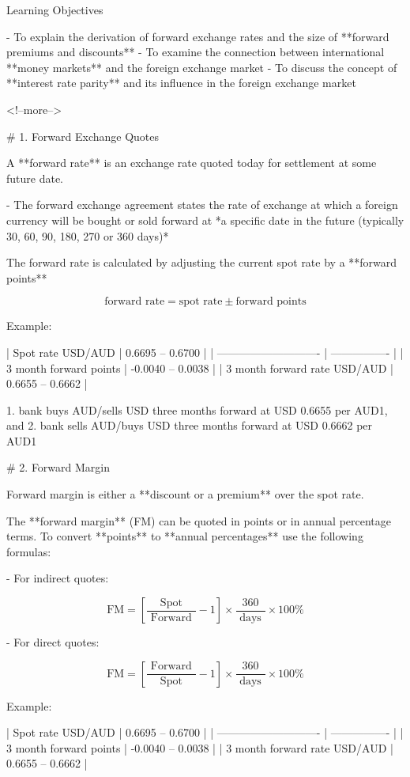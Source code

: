 Learning Objectives

- To explain the derivation of forward exchange rates and the size of **forward premiums and discounts**
- To examine the connection between international **money markets** and the foreign exchange market
- To discuss the concept of **interest rate parity** and its influence in the foreign exchange market

<!--more-->

# 1. Forward Exchange Quotes

A **forward rate** is an exchange rate quoted today for settlement at some future date.

- The forward exchange agreement states the rate of exchange at which a foreign currency will be bought or sold forward at *a specific date in the future (typically 30, 60, 90, 180, 270 or 360 days)*

The forward rate is calculated by adjusting the current spot rate by a **forward points**

$$
\text{forward rate} = \text{spot rate} \pm \text{forward points}
$$

Example:

| Spot rate USD/AUD            | 0.6695 – 0.6700  |
| ---------------------------- | ---------------- |
| 3 month forward points       | -0.0040 – 0.0038 |
| 3 month forward rate USD/AUD | 0.6655 – 0.6662  |

1. bank buys AUD/sells USD three months forward at USD 0.6655 per AUD1, and
2. bank sells AUD/buys USD three months forward at USD 0.6662 per AUD1


# 2. Forward Margin

Forward margin is either a **discount or a premium** over the spot rate.

The **forward margin** (FM) can be quoted in points or in annual percentage terms. To convert **points** to **annual percentages** use the following formulas:

- For indirect quotes:

$$ 
\text{FM}=\left[\frac{\text { Spot }}{\text { Forward }}-1 \right] \times \frac{360}{\text { days }} \times 100\%
$$

- For direct quotes:

$$ 
\text{FM}=\left[\frac{\text { Forward }}{\text { Spot }}-1 \right] \times \frac{360}{\text { days }} \times 100\%
$$

Example:

| Spot rate USD/AUD            | 0.6695 – 0.6700  |
| ---------------------------- | ---------------- |
| 3 month forward points       | -0.0040 – 0.0038 |
| 3 month forward rate USD/AUD | 0.6655 – 0.6662  |

